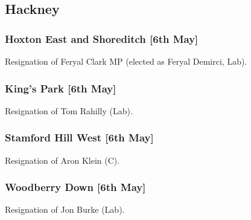 \documentclass[a4paper,openany]{book}
\begin{document}
\begin{resultsiii}
\subsection*{Hackney}

\subsubsection*{Hoxton East and Shoreditch \hspace*{\fill}\nolinebreak[1]%
	\enspace\hspace*{\fill}
	[6th May]}


Resignation of Feryal Clark MP (elected as Feryal Demirci, Lab).

\subsubsection*{King's Park \hspace*{\fill}\nolinebreak[1]%
	\enspace\hspace*{\fill}
	[6th May]}


Resignation of Tom Rahilly (Lab).

\subsubsection*{Stamford Hill West \hspace*{\fill}\nolinebreak[1]%
	\enspace\hspace*{\fill}
	[6th May]}


Resignation of Aron Klein (C).

\subsubsection*{Woodberry Down \hspace*{\fill}\nolinebreak[1]%
	\enspace\hspace*{\fill}
	[6th May]}


Resignation of Jon Burke (Lab).


\end{resultsiii}
\end{document}
